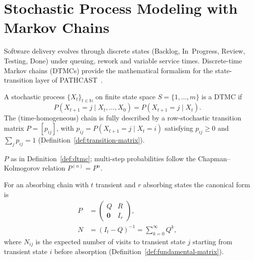 \section{Stochastic Process Modeling with Markov Chains}
\label{sec:markov}

Software delivery evolves through discrete states (Backlog, In~Progress,
Review, Testing, Done) under queuing, rework and variable service times.
Discrete-time Markov chains (DTMCs) provide the mathematical formalism for
the state-transition layer of PATHCAST~\cite{Spedicato2017, Haggstrom2002}.

\begin{definition}
\label{def:dtmc}
A stochastic process $\{X_t\}_{t \in \mathbb{N}}$ on finite state space
$S = \{1, \ldots, m\}$ is a DTMC if
\begin{equation}
\label{eq:markov-property}
P(X_{t+1} = j \mid X_t, \ldots, X_0) = P(X_{t+1} = j \mid X_t).
\end{equation}
The (time-homogeneous) chain is fully described by a row-stochastic
transition matrix $P = [p_{ij}]$, with $p_{ij} = P(X_{t+1}=j \mid X_t=i)$
satisfying $p_{ij} \geq 0$ and $\sum_j p_{ij} = 1$
(Definition~\ref{def:transition-matrix}).
\end{definition}

\begin{definition}
\label{def:transition-matrix}
$P$ as in Definition~\ref{def:dtmc}; multi-step probabilities follow the
Chapman--Kolmogorov relation $P^{(n)} = P^n$.
\end{definition}

\begin{definition}
\label{def:absorbing}
For an absorbing chain with $t$ transient and $r$ absorbing states the
canonical form is
\begin{align}
P &= \begin{pmatrix} Q & R \\ \mathbf{0} & I_r \end{pmatrix}, \label{eq:absorbing-form} \\
N &= (I_t - Q)^{-1} = \sum_{k=0}^{\infty} Q^k, \label{eq:fundamental}
\end{align}
where $N_{ij}$ is the expected number of visits to transient state $j$
starting from transient state $i$ before absorption
(Definition~\ref{def:fundamental-matrix}).
\end{definition}

